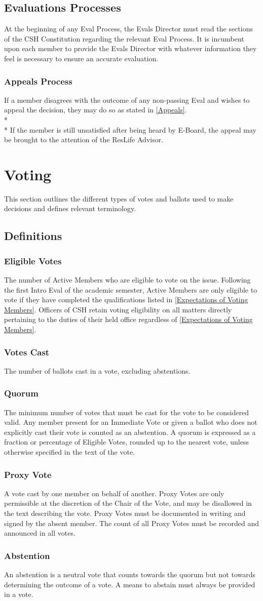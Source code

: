 \documentclass{article}
\newcommand{\article}[1]{\section{#1} \label{#1}}
\newcommand{\asection}[1]{\subsection{#1} \label{#1}}
\newcommand{\asubsection}[1]{\subsubsection{#1} \label{#1}}
\begin{document}
\asection{Evaluations Processes}
At the beginning of any Eval Process, the Evals Director must read the sections of the CSH Constitution regarding the relevant Eval Process.
It is incumbent upon each member to provide the Evals Director with whatever information they feel is necessary to ensure an accurate evaluation.

\asubsection{Appeals Process}
If a member disagrees with the outcome of any non-passing Eval and wishes to appeal the decision, they may do so as stated in \ref{Appeals}.
\\* \\*
If the member is still unsatisfied after being heard by E-Board, the appeal may be brought to the attention of the ResLife Advisor.

\article{Voting}
This section outlines the different types of votes and ballots used to make decisions and defines relevant terminology.

\asection{Definitions}

\asubsection{Eligible Votes}
The number of Active Members who are eligible to vote on the issue.
Following the first Intro Eval of the academic semester, Active Members are only eligible to vote if they have completed the qualifications listed in \ref{Expectations of Voting Members}.
Officers of CSH retain voting eligibility on all matters directly pertaining to the duties of their held office regardless of \ref{Expectations of Voting Members}.

\asubsection{Votes Cast}
The number of ballots cast in a vote, excluding abstentions.

\asubsection{Quorum}
The minimum number of votes that must be cast for the vote to be considered valid.
Any member present for an Immediate Vote or given a ballot who does not explicitly cast their vote is counted as an abstention.
A quorum is expressed as a fraction or percentage of Eligible Votes, rounded up to the nearest vote, unless otherwise specified in the text of the vote.

\asubsection{Proxy Vote}
A vote cast by one member on behalf of another.
Proxy Votes are only permissible at the discretion of the Chair of the Vote, and may be disallowed in the text describing the vote.
Proxy Votes must be documented in writing and signed by the absent member.
The count of all Proxy Votes must be recorded and announced in all votes.

\asubsection{Abstention}
An abstention is a neutral vote that counts towards the quorum but not towards determining the outcome of a vote.
A means to abstain must always be provided in a vote.
\end{document}
